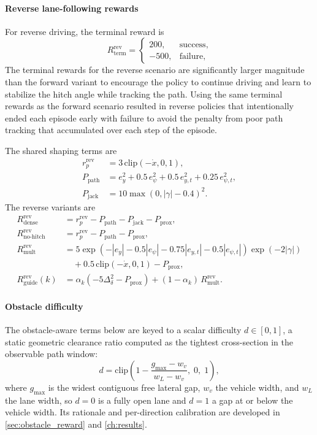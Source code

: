 \paragraph{Reverse lane-following rewards}
For reverse driving, the terminal reward is
\begin{equation}
R_{\mathrm{term}}^{\mathrm{rev}} =
\begin{cases}
200, & \text{success}, \\
-500, & \text{failure},
\end{cases}
\end{equation}
The terminal rewards for the reverse scenario are significantly larger magnitude than the forward variant to encourage the policy to continue driving and learn to stabilize the hitch angle while tracking the path. Using the same terminal rewards as the forward scenario resulted in reverse policies that intentionally ended each episode early with failure to avoid the penalty from poor path tracking that accumulated over each step of the episode.

The shared shaping terms are
\begin{align}
r_p^{\mathrm{rev}} &= 3\,\mathrm{clip}(-\dot{x}, 0, 1), \\
P_{\mathrm{path}} &= e_y^2 + 0.5\,e_\psi^2 + 0.5\,e_{y,t}^2 + 0.25\,e_{\psi,t}^2,
\\
P_{\mathrm{jack}} &= 10\max(0, |\gamma| - 0.4)^2.
\end{align}
The reverse variants are
\begin{align}
R_{\mathrm{dense}}^{\mathrm{rev}} &= r_p^{\mathrm{rev}} - P_{\mathrm{path}} - P_{\mathrm{jack}} - P_{\mathrm{prox}},
\\
R_{\mathrm{no\mbox{-}hitch}}^{\mathrm{rev}} &= r_p^{\mathrm{rev}} - P_{\mathrm{path}} - P_{\mathrm{prox}},
\\
R_{\mathrm{mult}}^{\mathrm{rev}} &= 5\exp\!\left(-|e_y|-0.5|e_\psi|-0.75|e_{y,t}|-0.5|e_{\psi,t}|\right)\exp\!\left(-2|\gamma|\right) \nonumber\\
&\quad + 0.5\,\mathrm{clip}(-\dot{x}, 0, 1) - P_{\mathrm{prox}},
\\
R_{\mathrm{guide}}^{\mathrm{rev}}(k) &= \alpha_k
\left(-5\Delta_\delta^2 - P_{\mathrm{prox}}\right)
+ (1-\alpha_k)\,R_{\mathrm{mult}}^{\mathrm{rev}}.
\end{align}

\paragraph{Obstacle difficulty}
The obstacle-aware terms below are keyed to a scalar difficulty $d \in [0,1]$, a
static geometric clearance ratio computed as the tightest cross-section in the observable path window:
\begin{equation}
d = \mathrm{clip}\!\left(1 - \frac{g_{\max} - w_v}{w_L - w_v},\; 0,\; 1\right),
\label{eq:obstacle_difficulty}
\end{equation}
where $g_{\max}$ is the widest contiguous free lateral gap, $w_v$ the vehicle width, and
$w_L$ the lane width, so $d=0$ is a fully open lane and $d=1$ a gap at or below the vehicle
width. Its rationale and per-direction calibration are developed in \cref{sec:obstacle_reward}
and \cref{ch:results}.


